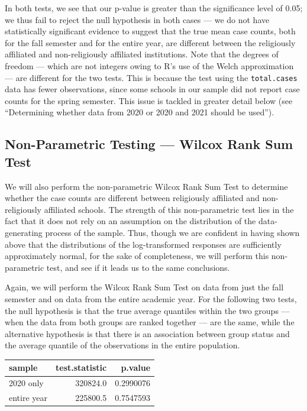 \documentclass[
]{article}
\begin{document}
In both tests, we see that our p-value is greater than the significance
level of 0.05; we thus fail to reject the null hypothesis in both cases
--- we do not have statistically significant evidence to suggest that
the true mean case counts, both for the fall semester and for the entire
year, are different between the religiously affiliated and
non-religiously affiliated institutions. Note that the degrees of
freedom --- which are not integers owing to R's use of the Welch
approximation --- are different for the two tests. This is because the
test using the \texttt{total.cases} data has fewer observations, since
some schools in our sample did not report case counts for the spring
semester. This issue is tackled in greater detail below (see
``Determining whether data from 2020 or 2020 and 2021 should be used'').

\hypertarget{non-parametric-testing-wilcox-rank-sum-test}{%
\subsection{Non-Parametric Testing --- Wilcox Rank Sum
Test}\label{non-parametric-testing-wilcox-rank-sum-test}}

We will also perform the non-parametric Wilcox Rank Sum Test to
determine whether the case counts are different between religiously
affiliated and non-religiously affiliated schools. The strength of this
non-parametric test lies in the fact that it does not rely on an
assumption on the distribution of the data-generating process of the
sample. Thus, though we are confident in having shown above that the
distributions of the log-transformed responses are sufficiently
approximately normal, for the sake of completeness, we will perform this
non-parametric test, and see if it leads us to the same conclusions.

Again, we will perform the Wilcox Rank Sum Test on data from just the
fall semester and on data from the entire academic year. For the
following two tests, the null hypothesis is that the true average
quantiles within the two groups --- when the data from both groups are
ranked together --- are the same, while the alternative hypothesis is
that there is an association between group status and the average
quantile of the observations in the entire population.

\begin{longtable}[]{@{}lrr@{}}
\toprule()
sample & test.statistic & p.value \\
\midrule()
\endhead
2020 only & 320824.0 & 0.2990076 \\
entire year & 225800.5 & 0.7547593 \\
\bottomrule()
\end{longtable}
\end{document}
